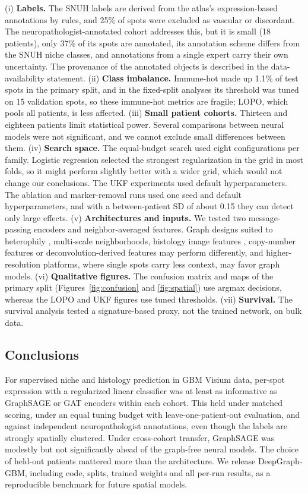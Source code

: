 \documentclass[11pt,letterpaper]{article}
\begin{document}
(i) \textbf{Labels.} The SNUH labels are derived from the atlas's expression-based annotations by rules, and 25\% of spots were excluded as vascular or discordant. The neuropathologist-annotated cohort addresses this, but it is small (18 patients), only 37\% of its spots are annotated, its annotation scheme differs from the SNUH niche classes, and annotations from a single expert carry their own uncertainty. The provenance of the annotated objects is described in the data-availability statement. (ii) \textbf{Class imbalance.} Immune-hot made up 1.1\% of test spots in the primary split, and in the fixed-split analyses its threshold was tuned on 15 validation spots, so these immune-hot metrics are fragile; LOPO, which pools all patients, is less affected. (iii) \textbf{Small patient cohorts.} Thirteen and eighteen patients limit statistical power. Several comparisons between neural models were not significant, and we cannot exclude small differences between them. (iv) \textbf{Search space.} The equal-budget search used eight configurations per family. Logistic regression selected the strongest regularization in the grid in most folds, so it might perform slightly better with a wider grid, which would not change our conclusions. The UKF experiments used default hyperparameters. The ablation and marker-removal runs used one seed and default hyperparameters, and with a between-patient SD of about 0.15 they can detect only large effects. (v) \textbf{Architectures and inputs.} We tested two message-passing encoders and neighbor-averaged features. Graph designs suited to heterophily \cite{zhu2020homophily}, multi-scale neighborhoods, histology image features \cite{hu2021spagcn}, copy-number features \cite{ritter2025} or deconvolution-derived features \cite{kleshchevnikov2022} may perform differently, and higher-resolution platforms, where single spots carry less context, may favor graph models. (vi) \textbf{Qualitative figures.} The confusion matrix and maps of the primary split (Figures~\ref{fig:confusion} and \ref{fig:spatial}) use argmax decisions, whereas the LOPO and UKF figures use tuned thresholds. (vii) \textbf{Survival.} The survival analysis tested a signature-based proxy, not the trained network, on bulk data.

\subsection{Conclusions}

For supervised niche and histology prediction in GBM Visium data, per-spot expression with a regularized linear classifier was at least as informative as GraphSAGE or GAT encoders within each cohort. This held under matched scoring, under an equal tuning budget with leave-one-patient-out evaluation, and against independent neuropathologist annotations, even though the labels are strongly spatially clustered. Under cross-cohort transfer, GraphSAGE was modestly but not significantly ahead of the graph-free neural models. The choice of held-out patients mattered more than the architecture. We release DeepGraph-GBM, including code, splits, trained weights and all per-run results, as a reproducible benchmark for future spatial models.
\end{document}
